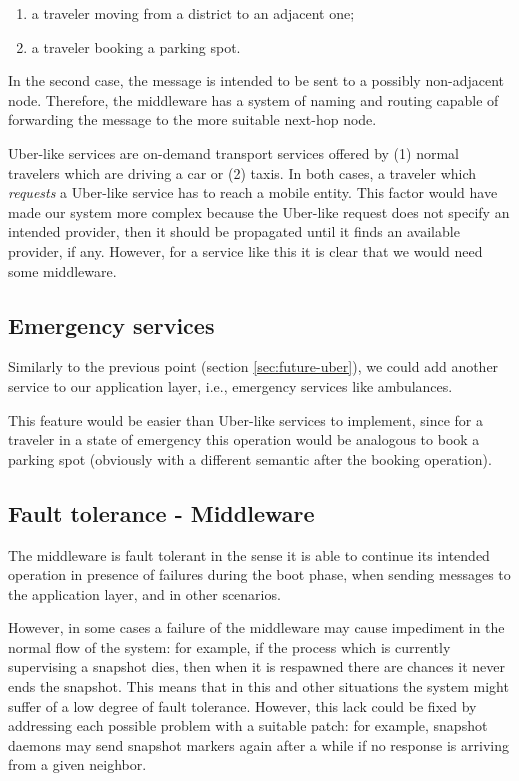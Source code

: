 \begin{enumerate}
  \item a traveler moving from a district to an adjacent one;
  \item a traveler booking a parking spot.
\end{enumerate}

In the second case, the message is intended to be sent to a possibly
non-adjacent node. Therefore, the middleware has a system of naming and routing
capable of forwarding the message to the more suitable next-hop node.

Uber-like services are on-demand transport services offered by (1) normal
travelers which are driving a car or (2) taxis. In both cases, a traveler
which \textit{requests} a Uber-like service has to reach a mobile entity.
This factor would have made our system more complex because the Uber-like
request does not specify an intended provider, then it should be propagated
until it finds an available provider, if any.
However, for a service like this it is clear that we would need some middleware.

\subsection{Emergency services}
Similarly to the previous point (section \ref{sec:future-uber}), we could add
another service to our application layer, i.e., emergency services like
ambulances.

This feature would be easier than Uber-like services to implement, since for a
traveler in a state of emergency this operation would be analogous to book a
parking spot (obviously with a different semantic after the booking operation).

\subsection{Fault tolerance - Middleware}
The middleware is fault tolerant in the sense it is able to continue its
intended operation in presence of failures
during the boot phase, when sending messages to the application layer, and in
other scenarios.

However, in some cases a failure of the middleware may cause impediment in the
normal flow of the system: for example, if the process which is currently
supervising a snapshot dies, then when it is respawned there are chances it
never ends the snapshot.
This means that in this and other situations the system might suffer of a low
degree of fault tolerance. However, this lack could be fixed by
addressing each possible problem with a suitable patch: for example, snapshot
daemons may send snapshot markers again after a while if no response is
arriving from a given neighbor.

